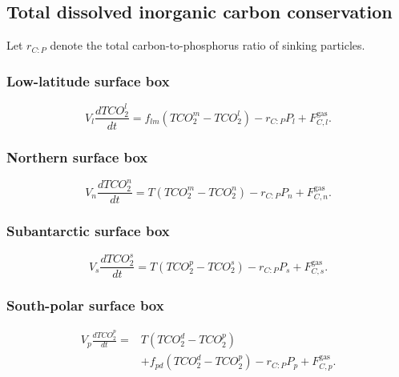 \documentclass[11pt]{article}
\begin{document}
\subsection{Total dissolved inorganic carbon conservation}

Let \(r_{C:P}\) denote the total carbon-to-phosphorus ratio
of sinking particles.

\subsubsection{Low-latitude surface box}

\begin{equation}
V_l\frac{dTCO_2^l}{dt}
=
f_{lm}
\left(
TCO_2^m-TCO_2^l
\right)
-
r_{C:P}P_l
+
F^{\mathrm{gas}}_{C,l}.
\label{eq:seven_tco2_l}
\end{equation}

\subsubsection{Northern surface box}

\begin{equation}
V_n\frac{dTCO_2^n}{dt}
=
T
\left(
TCO_2^m-TCO_2^n
\right)
-
r_{C:P}P_n
+
F^{\mathrm{gas}}_{C,n}.
\label{eq:seven_tco2_n}
\end{equation}

\subsubsection{Subantarctic surface box}

\begin{equation}
V_s\frac{dTCO_2^s}{dt}
=
T
\left(
TCO_2^p-TCO_2^s
\right)
-
r_{C:P}P_s
+
F^{\mathrm{gas}}_{C,s}.
\label{eq:seven_tco2_s}
\end{equation}

\subsubsection{South-polar surface box}

\begin{equation}
\begin{split}
V_p\frac{dTCO_2^p}{dt}
={}&
T
\left(
TCO_2^d-TCO_2^p
\right)
\\
&+
f_{pd}
\left(
TCO_2^d-TCO_2^p
\right)
-
r_{C:P}P_p
+
F^{\mathrm{gas}}_{C,p}.
\end{split}
\label{eq:seven_tco2_p}
\end{equation}
\end{document}
